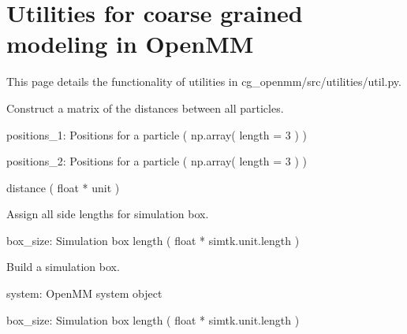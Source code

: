 \documentclass[letterpaper,12pt,english,openany,oneside]{sphinxmanual}
\begin{document}
\chapter{Utilities for coarse grained modeling in OpenMM}
\label{\detokenize{utilities:utilities-for-coarse-grained-modeling-in-openmm}}\label{\detokenize{utilities::doc}}
This page details the functionality of utilities in cg\_openmm/src/utilities/util.py.

\label{\detokenize{utilities:module-utilities.util}}

\begin{fulllineitems}
\label{\detokenize{utilities:utilities.util.distance}}
Construct a matrix of the distances between all particles.

positions\_1: Positions for a particle
( np.array( length = 3 ) )

positions\_2: Positions for a particle
( np.array( length = 3 ) )

distance
( float * unit )

\end{fulllineitems}


\begin{fulllineitems}
\label{\detokenize{utilities:utilities.util.get_box_vectors}}
Assign all side lengths for simulation box.

box\_size: Simulation box length ( float * simtk.unit.length )

\end{fulllineitems}


\begin{fulllineitems}
\label{\detokenize{utilities:utilities.util.set_box_vectors}}
Build a simulation box.

system: OpenMM system object

box\_size: Simulation box length ( float * simtk.unit.length )

\end{fulllineitems}
\end{document}
